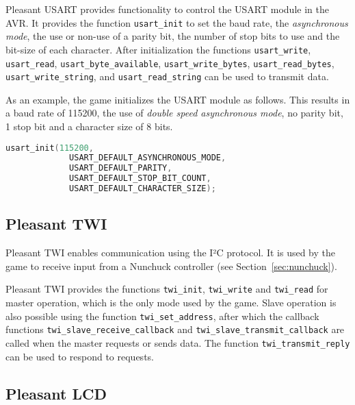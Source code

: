 \begin{sloppypar}
  Pleasant USART provides functionality to control the USART module in the
  AVR\@. It provides the function \texttt{usart\_init} to set the baud rate,
  the \emph{asynchronous mode}, the use or non-use of a parity bit, the number
  of stop bits to use and the bit-size of each character. After initialization
  the functions \texttt{usart\_write}, \texttt{usart\_read},
  \texttt{usart\_byte\_available}, \texttt{usart\_write\_bytes},
  \texttt{usart\_read\_bytes}, \texttt{usart\_write\_string}, and
  \texttt{usart\_read\_string} can be used to transmit data.
\end{sloppypar}

As an example, the game initializes the USART module as follows. This results
in a baud rate of 115200, the use of \emph{double speed asynchronous mode}, no
parity bit, 1 stop bit and a character size of 8 bits.

\begin{lstlisting}[language=C,frame=single]
  usart_init(115200,
             USART_DEFAULT_ASYNCHRONOUS_MODE,
             USART_DEFAULT_PARITY,
             USART_DEFAULT_STOP_BIT_COUNT,
             USART_DEFAULT_CHARACTER_SIZE);
\end{lstlisting}

\subsection{Pleasant TWI}
\label{sec:libraries/pleasant-twi}

Pleasant TWI enables communication using the I²C protocol. It is used by the
game to receive input from a Nunchuck controller (see
Section~\ref{sec:nunchuck}).

\begin{sloppypar}
  Pleasant TWI provides the functions \texttt{twi\_init}, \texttt{twi\_write}
  and \texttt{twi\_read} for master operation, which is the only mode used by
  the game. Slave operation is also possible using the function
  \texttt{twi\_set\_address}, after which the callback functions
  \texttt{twi\_slave\_receive\_callback} and
  \texttt{twi\_slave\_transmit\_callback} are called when the master requests
  or sends data. The function \texttt{twi\_transmit\_reply} can be used to
  respond to requests.
\end{sloppypar}

\subsection{Pleasant LCD}
\label{sec:libraries/pleasant-lcd}

